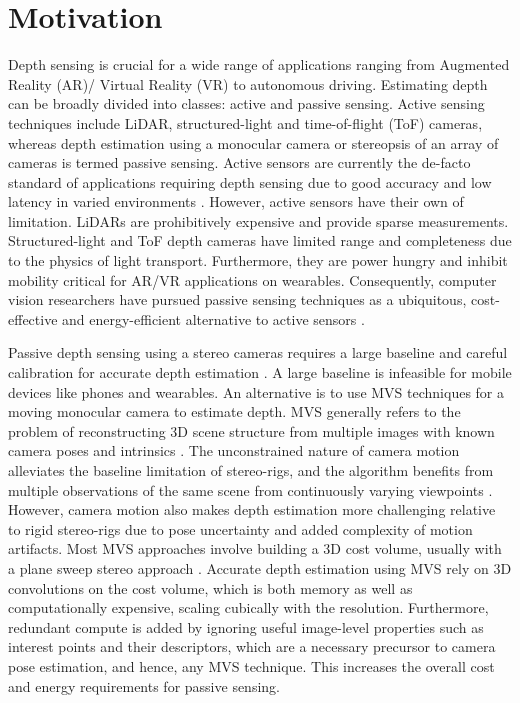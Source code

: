 \documentclass[runningheads]{llncs}
\begin{document}
\section{Motivation}


Depth sensing is crucial for a wide range of applications ranging from Augmented Reality (AR)/ Virtual Reality (VR) to autonomous driving. Estimating depth can be broadly divided into classes: active and passive sensing. Active sensing techniques include LiDAR, structured-light and time-of-flight (ToF) cameras, whereas depth estimation using a monocular camera or stereopsis of an array of cameras is termed passive sensing. Active sensors are currently the de-facto standard of applications requiring depth sensing due to good accuracy and low latency in varied environments \cite{zhang2012microsoft}. However, active sensors have their own of limitation. LiDARs are prohibitively expensive and provide sparse measurements. Structured-light and ToF depth cameras have limited range and completeness due to the physics of light transport. Furthermore, they are power hungry and inhibit mobility critical for AR/VR applications on wearables. Consequently, computer vision researchers have pursued passive sensing techniques  as a ubiquitous, cost-effective and energy-efficient alternative to active sensors \cite{Ma2017SparseToDense}. 

Passive depth sensing using a stereo cameras requires a large baseline and careful calibration for accurate depth estimation \cite{chang2018pyramid}. A large baseline is infeasible for mobile devices like phones and wearables. An alternative is to use MVS techniques for a moving monocular camera to estimate depth. MVS generally refers to the problem of reconstructing 3D scene structure from multiple images with known camera poses and intrinsics \cite{hartley2003multiple}. The unconstrained nature of camera motion alleviates the baseline limitation of stereo-rigs, and the algorithm benefits from multiple observations of the same scene from continuously varying viewpoints \cite{hou2019multi}. However, camera motion also makes depth estimation more challenging relative to rigid stereo-rigs due to pose uncertainty and added complexity of motion artifacts. Most MVS approaches involve building a 3D cost volume, usually with a plane sweep stereo approach \cite{yao2018mvsnet,huang2018deepmvs}. Accurate depth estimation using MVS rely on 3D convolutions on the cost volume, which is both memory as well as computationally expensive, scaling cubically with the resolution. Furthermore, redundant compute is added by ignoring useful image-level properties such as interest points and their descriptors, which are a necessary precursor to camera pose estimation, and hence, any MVS technique.  This increases the overall cost and energy requirements for passive sensing.  
\end{document}
